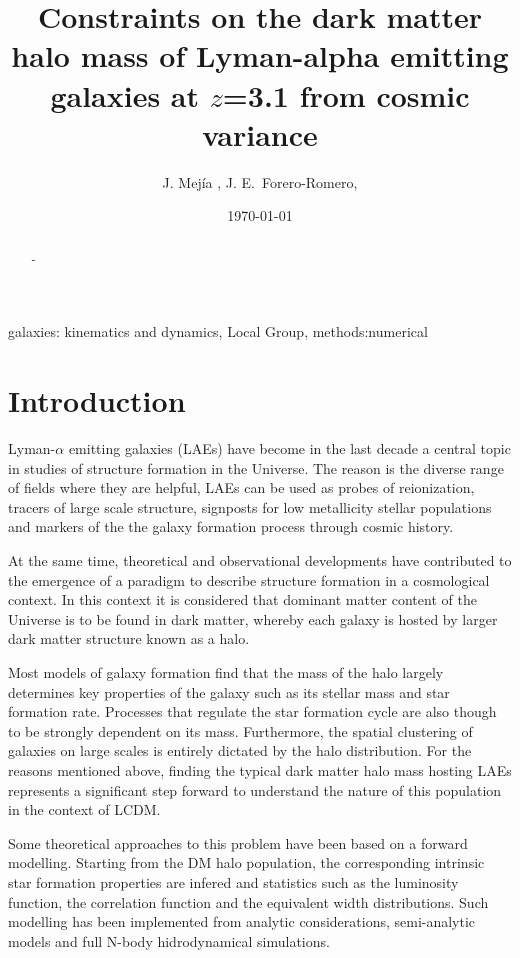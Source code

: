 \documentclass{emulateapj}
\begin{document}
\title{Constraints on the dark matter halo mass of Lyman-alpha emitting galaxies at $z$=3.1 from cosmic variance}

\author{
J. Mej\'ia , 
J. E.\ Forero-Romero, 
}


\date{\today}

\begin{abstract}
-
\end{abstract}

\begin{keywords}
{galaxies: kinematics and dynamics, Local Group, methods:numerical}
\end{keywords}


\section{Introduction}
Lyman-$\alpha$ emitting galaxies (LAEs) have become in the last decade a central topic in studies of structure formation in the Universe. The reason is the diverse range of fields where they are helpful, LAEs can be used as probes of reionization, tracers of large scale structure, signposts for low metallicity stellar populations and markers of the the galaxy formation process through cosmic history.

At the same time, theoretical and observational developments have contributed to the emergence of a paradigm to describe structure formation in a cosmological context. In this context it is considered that dominant matter content of the Universe is to be found in dark matter, whereby each galaxy is hosted by larger dark matter structure known as a halo.

Most models of galaxy formation find that the mass of the halo largely determines key properties of the galaxy such as its stellar mass and star formation rate. Processes that regulate the star formation cycle are also though to be strongly dependent on its mass. Furthermore, the spatial clustering of galaxies on large scales is entirely dictated by the halo distribution.  For the reasons mentioned above, finding the typical dark matter halo mass hosting LAEs represents a significant step forward to understand the nature of this population in the context of LCDM. 

Some theoretical approaches to this problem have been based on a forward modelling. Starting from the DM halo population, the corresponding intrinsic star formation properties are infered and statistics such as the luminosity function, the correlation function and the equivalent width distributions. Such modelling has been implemented from analytic considerations, semi-analytic models and full N-body hidrodynamical simulations.
\end{document}

